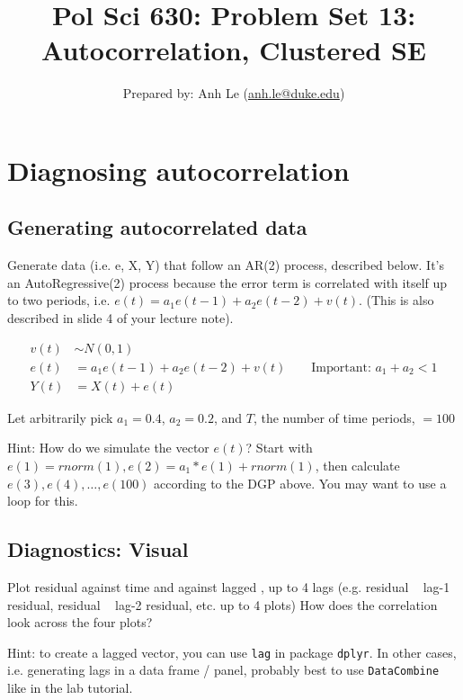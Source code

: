 \documentclass{article}\usepackage[]{graphicx}\usepackage[]{color}
\begin{document}
\title{Pol Sci 630:  Problem Set 13: Autocorrelation, Clustered SE}
\author{Prepared by: Anh Le (\href{mailto:anh.le@duke.edu}{anh.le@duke.edu})}
\maketitle

\section{Diagnosing autocorrelation}

\subsection{Generating autocorrelated data}

Generate data (i.e. e, X, Y) that follow an AR(2) process, described below. It's an AutoRegressive(2) process because the error term is correlated with itself up to two periods, i.e. $e(t) = a_1e(t-1) + a_2 e(t-2) + v(t)$. (This is also described in slide 4 of your lecture note).

\begin{align}
v(t) &\sim N(0, 1) \\
e(t) &= a_1e(t-1) + a_2 e(t-2) + v(t) \qquad \text{Important: $a_1 + a_2 < 1$} \\
Y(t) &= X(t) + e(t)
\end{align}

Let arbitrarily pick $a_1 = 0.4$, $a_2 = 0.2$, and $T$, the number of time periods, $= 100$

Hint: How do we simulate the vector $e(t)$? Start with $e(1) = rnorm(1), e(2) = a_1 * e(1) + rnorm(1)$, then calculate $e(3), e(4), \dots, e(100)$ according to the DGP above. You may want to use a loop for this.

\subsection{Diagnostics: Visual}

Plot residual against time and against lagged , up to 4 lags (e.g. residual ~ lag-1 residual, residual ~ lag-2 residual, etc. up to 4 plots) How does the correlation look across the four plots?

Hint: to create a lagged vector, you can use \verb`lag` in package \verb`dplyr`. In other cases, i.e. generating lags in a data frame / panel, probably best to use \verb`DataCombine` like in the lab tutorial.
\end{document}
